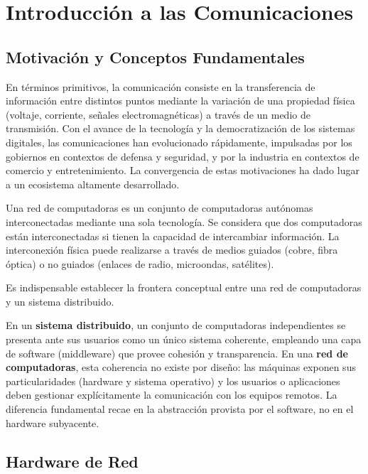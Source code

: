 \section{Introducción a las Comunicaciones}

\subsection{Motivación y Conceptos Fundamentales}

En términos primitivos, la comunicación consiste en la transferencia de información entre distintos puntos mediante la variación de una propiedad física (voltaje, corriente, señales electromagnéticas) a través de un medio de transmisión. Con el avance de la tecnología y la democratización de los sistemas digitales, las comunicaciones han evolucionado rápidamente, impulsadas por los gobiernos en contextos de defensa y seguridad, y por la industria en contextos de comercio y entretenimiento. La convergencia de estas motivaciones ha dado lugar a un ecosistema altamente desarrollado.

\begin{definicion}
Una red de computadoras es un conjunto de computadoras autónomas interconectadas mediante una sola tecnología. Se considera que dos computadoras están interconectadas si tienen la capacidad de intercambiar información. La interconexión física puede realizarse a través de medios guiados (cobre, fibra óptica) o no guiados (enlaces de radio, microondas, satélites).
\end{definicion}

Es indispensable establecer la frontera conceptual entre una red de computadoras y un sistema distribuido.

\begin{obs}
En un \textbf{sistema distribuido}, un conjunto de computadoras independientes se presenta ante sus usuarios como un único sistema coherente, empleando una capa de software (middleware) que provee cohesión y transparencia. En una \textbf{red de computadoras}, esta coherencia no existe por diseño: las máquinas exponen sus particularidades (hardware y sistema operativo) y los usuarios o aplicaciones deben gestionar explícitamente la comunicación con los equipos remotos. La diferencia fundamental recae en la abstracción provista por el software, no en el hardware subyacente.
\end{obs}

\subsection{Hardware de Red}

